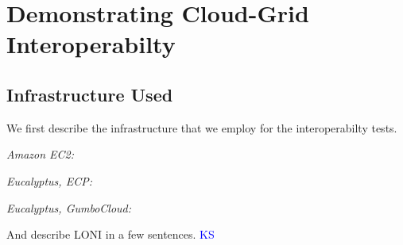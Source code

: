 \documentclass[conference,final]{IEEEtran}
\newcommand{\sagamapreduce }{SAGA-MapReduce }
\begin{document}



\section{Demonstrating Cloud-Grid Interoperabilty}

\subsection*{Infrastructure Used} We first describe the 
infrastructure that we employ for the interoperabilty tests.

{\it Amazon EC2:}

{\it Eucalyptus, ECP:}

{\it Eucalyptus, GumboCloud:}

And describe LONI in a few sentences.  {\textcolor{blue}{KS}}
\end{document}
